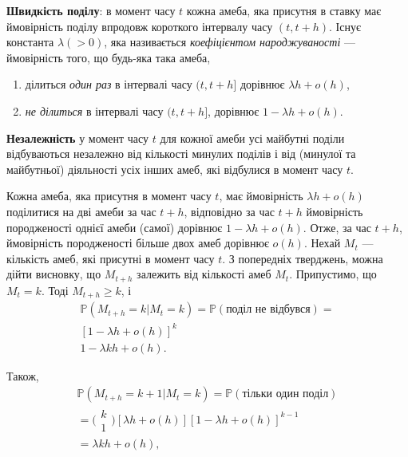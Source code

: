 \documentclass[12pt,fleqn]{article}
\numberwithin{figure}{section}
\numberwithin{equation}{section}
\begin{document}
\textbf{Швидкість поділу}: в момент часу $t$ кожна амеба, яка присутня в ставку має ймовірність поділу впродовж короткого інтервалу часу $(t, t + h)$. Існує константа $\lambda (>0)$, яка називається \emph{коефіцієнтом народжува\-ності} --- ймовірність того, що будь-яка така амеба,
\begin{enumerate}
  \item ділиться \emph{один раз} в інтервалі часу $(t, t+ h]$ дорівнює $\lambda h + o(h)$,
  \item \emph{не ділиться} в інтервалі часу $(t, t+ h]$, дорівнює $1 - \lambda h + o(h)$.
\end{enumerate}

\textbf{Незалежність} у момент часу $t$ для кожної амеби усі майбутні поділи відбуваються незалежно від кількості минулих поділів і від (минулої та майбутньої) діяльності усіх інших амеб, які відбулися в момент часу $t$.

Кожна амеба, яка присутня в момент часу $t$, має ймовірність $\lambda h + o(h)$ поділитися на дві амеби за час $t+h$, відповідно за час $t+h$ ймовірність породженості однієї амеби (самої) дорівнює $1 - \lambda h + o(h)$. Отже, за час $t+h$, ймовірність породженості більше двох амеб дорівнює $o(h)$. Нехай $M_t$ --- кількість амеб, які присутні в момент часу $t$. З попередніх тверджень, можна дійти висновку, що $M_{t+h}$ залежить від кількості амеб $M_t$. Припустимо, що $M_t = k$. Тоді $M_{t+h}\geq k$, і
\begin{equation}
  \begin{gathered}
  \mathbb{P}(M_{t+h}=k\big| M_t=k) = \mathbb{P}(\text{поділ не відбувся}) =  \\
  [1-\lambda h + o(h)]^k \\
  1 - \lambda k h + o(h).
  \end{gathered}
\end{equation}

Також,
\begin{equation}
\begin{gathered}
\mathbb{P}(M_{t+h}=k+1 \big | M_t = k) = \mathbb{P}(\text{тільки один поділ})\\
=\bigg(\begin{matrix} k \\ 1 \end{matrix}\bigg)[\lambda h + o(h)][1-\lambda h + o(h)]^{k-1}\\
=\lambda k h + o(h),
\end{gathered}
\end{equation}
\end{document}
